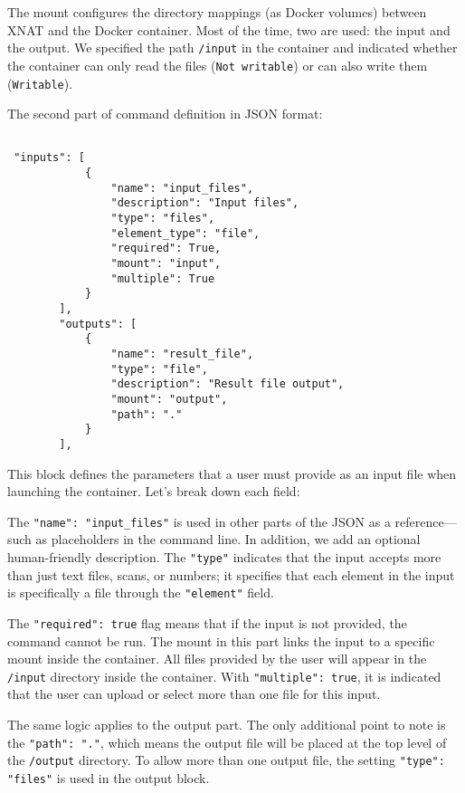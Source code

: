The mount configures the directory mappings (as Docker volumes) between XNAT and the Docker container. Most of the time, two are used: the input and the output.
We specified the path \texttt{/input} in the container and indicated whether the container can only read the files (\texttt{Not writable}) or can also write them (\texttt{Writable}).

The second part of command definition in JSON format:


\begin{lstlisting}

 "inputs": [
            {
                "name": "input_files",
                "description": "Input files",
                "type": "files",
                "element_type": "file",
                "required": True,
                "mount": "input",
                "multiple": True
            }
        ],
        "outputs": [
            {
                "name": "result_file",
                "type": "file",
                "description": "Result file output",
                "mount": "output",
                "path": "."
            }
        ],
\end{lstlisting}


This block defines the parameters that a user must provide as an input file when launching the container.
Let’s break down each field:

The \texttt{"name": "input\_files"} is used in other parts of the JSON as a reference---such as placeholders in the command line. In addition, we add an optional human-friendly description. The \texttt{"type"} indicates that the input accepts more than just text files, scans, or numbers; it specifies that each element in the input is specifically a file through the \texttt{"element"} field.

The \texttt{"required": true} flag means that if the input is not provided, the command cannot be run. The mount in this part links the input to a specific mount inside the container. All files provided by the user will appear in the \texttt{/input} directory inside the container. With \texttt{"multiple": true}, it is indicated that the user can upload or select more than one file for this input.

The same logic applies to the output part. The only additional point to note is the \texttt{"path": "."}, which means the output file will be placed at the top level of the \texttt{/output} directory. To allow more than one output file, the setting \texttt{"type": "files"} is used in the output block.

